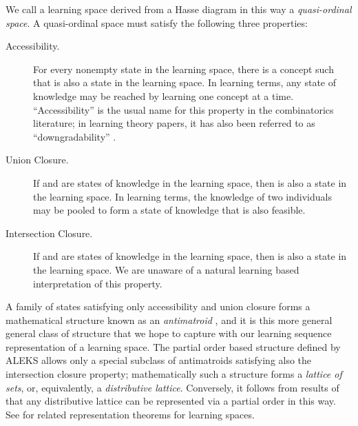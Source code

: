 \documentclass[11pt]{llncs}
\begin{document}
{We call a learning space derived from a Hasse diagram in this way a \emph{quasi-ordinal space}. A quasi-ordinal space must satisfy the following three properties:

\begin{description}
\item[Accessibility.]
For every nonempty state  in the learning space, there is a concept  such that  is also a state in the learning space. In learning terms, any state of knowledge may be reached by learning one concept at a time. ``Accessibility'' is the usual name for this property in the combinatorics literature;
in learning theory papers, it has also been referred to as ``downgradability'' \citep{doble01a}.

\item[Union Closure.]
If  and  are states of knowledge in the learning space, then  is also a state in the learning space. In learning terms, the knowledge of two individuals may be pooled to form a state of knowledge that is also feasible.

\item[Intersection Closure.]
If  and  are states of knowledge in the learning space, then  is also a state in the learning space. We are unaware of a natural learning based interpretation of this property.
\end{description}

A family of states satisfying only accessibility and union closure forms a mathematical structure known as an \emph{antimatroid} \citep{KorLovSch-91}, and it is this more general general class of structure that we hope to capture with our learning sequence representation of a learning space. The partial order based structure defined by ALEKS allows only a special subclass of antimatroids satisfying also the intersection closure property; mathematically such a structure forms a \emph{lattice of sets}, or, equivalently, a \emph{distributive lattice}.
Conversely, it follows from results of \citet{birkh37} that any distributive lattice can be represented via a partial order in this way. See \citet{doign99} for related representation theorems for learning spaces.

}
\end{document}
